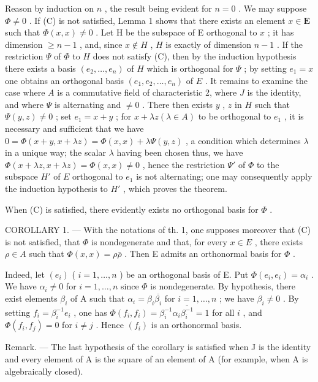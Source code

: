 Reason by induction on \(n\) , the result being evident for \(n=0\) . We may suppose \(\Phi\neq0\) . If (C) is not satisfied, Lemma 1 shows that there exists an element \(x\in\mathbf{E}\) such that \(\Phi(x,x)\neq0\) . Let H be the subspace of E orthogonal to \(x\) ; it has dimension \(\geqslant n-1\) , and, since \(x \notin H\) , \(H\) is exactly of dimension \(n-1\) . If the restriction \(\Psi\) of \(\Phi\) to \(H\) does not satisfy (C), then by the induction hypothesis there exists a basis \((e_2, \ldots, e_n)\) of \(H\) which is orthogonal for \(\Psi\) ; by setting \(e_1 = x\) one obtains an orthogonal basis \((e_1, e_2, \ldots, e_n)\) of \(E\) . It remains to examine the case where \(A\) is a commutative field of characteristic 2, where \(J\) is the identity, and where \(\Psi\) is alternating and \(\neq 0\) . There then exists \(y\) , \(z\) in \(H\) such that \(\Psi(y, z) \neq 0\) ; set \(e_1 = x + y\) ; for \(x + \lambda z (\lambda \in A)\) to be orthogonal to \(e_1\) , it is necessary and sufficient that we have \(0 = \Phi(x + y, x + \lambda z) = \Phi(x, x) + \lambda \Psi(y, z)\) , a condition which determines \(\lambda\) in a unique way; the scalar \(\lambda\) having been chosen thus, we have \(\Phi(x + \lambda z, x + \lambda z) = \Phi(x, x) \neq 0\) , hence the restriction \(\Psi'\) of \(\Phi\) to the subspace \(H'\) of \(E\) orthogonal to \(e_1\) is not alternating; one may consequently apply the induction hypothesis to \(H'\) , which proves the theorem.

When (C) is satisfied, there evidently exists no orthogonal basis for \(\Phi\) .

COROLLARY 1. --- With the notations of th. 1, one supposes moreover that (C) is not satisfied, that \(\Phi\) is nondegenerate and that, for every \(x \in E\) , there exists \(\rho \in A\) such that \(\Phi(x, x) = \rho \bar{\rho}\) . Then E admits an orthonormal basis for \(\Phi\) .

Indeed, let \((e_i)\) ( \(i = 1, \ldots, n\) ) be an orthogonal basis of E. Put \(\Phi(e_i, e_i) = \alpha_i\) . We have \(\alpha_i \neq 0\) for \(i = 1, \ldots, n\) since \(\Phi\) is nondegenerate. By hypothesis, there exist elements \(\beta_i\) of A such that \(\alpha_i = \beta_i \overline{\beta_i}\) for \(i = 1, \ldots, n\) ; we have \(\beta_i \neq 0\) . By setting \(f_i = \beta_i^{-1} e_i\) , one has \(\Phi(f_i, f_i) = \beta_i^{-1} \alpha_i \overline{\beta_i^{-1}} = 1\) for all \(i\) , and \(\Phi(f_i, f_j) = 0\) for \(i \neq j\) . Hence \((f_i)\) is an orthonormal basis.

Remark. --- The last hypothesis of the corollary is satisfied when J is the identity and every element of A is the square of an element of A (for example, when A is algebraically closed).

